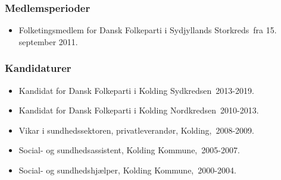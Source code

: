 \documentclass[11pt, a4paper]{awesome-cv}
\begin{document}
\begin{cvletter}
\subsubsection*{Medlemsperioder}
\begin{itemize}
\item Folketingsmedlem for Dansk Folkeparti i Sydjyllands Storkreds fra 15. september 2011.
\end{itemize}
\subsubsection*{Kandidaturer}
\begin{itemize}
\item Kandidat for Dansk Folkeparti i Kolding Sydkredsen 2013-2019.
\item Kandidat for Dansk Folkeparti i Kolding Nordkredsen 2010-2013.
\end{itemize}
\begin{itemize}
\item Vikar i sundhedssektoren, privatleverandør, Kolding, 2008-2009.
\item Social- og sundhedsassistent, Kolding Kommune, 2005-2007.
\item Social- og sundhedshjælper, Kolding Kommune, 2000-2004.
\end{itemize}
\end{cvletter}
\end{document}
